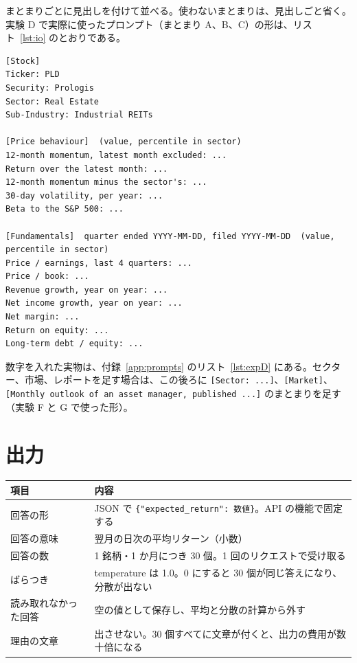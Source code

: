 \documentclass[xelatex,ja=standard,jafont=hiragino-pron,a4paper,10pt]{bxjsreport}
\newcommand{\code}[1]{\texttt{#1}}
\begin{document}
まとまりごとに見出しを付けて並べる。使わないまとまりは、見出しごと省く。実験 D で実際に使ったプロンプト（まとまり A、B、C）の形は、リスト~\ref{lst:io} のとおりである。

\begin{lstlisting}[caption={プロンプトの形（値は省略。かっこの中はセクターの中での百分位）},label={lst:io}]
[Stock]
Ticker: PLD
Security: Prologis
Sector: Real Estate
Sub-Industry: Industrial REITs

[Price behaviour]  (value, percentile in sector)
12-month momentum, latest month excluded: ...
Return over the latest month: ...
12-month momentum minus the sector's: ...
30-day volatility, per year: ...
Beta to the S&P 500: ...

[Fundamentals]  quarter ended YYYY-MM-DD, filed YYYY-MM-DD  (value, percentile in sector)
Price / earnings, last 4 quarters: ...
Price / book: ...
Revenue growth, year on year: ...
Net income growth, year on year: ...
Net margin: ...
Return on equity: ...
Long-term debt / equity: ...
\end{lstlisting}

数字を入れた実物は、付録~\ref{app:prompts} のリスト~\ref{lst:expD} にある。セクター、市場、レポートを足す場合は、この後ろに \code{[Sector: ...]}、\code{[Market]}、\code{[Monthly outlook of an asset manager, published ...]} のまとまりを足す（実験 F と G で使った形）。

\section{出力}

\begin{longtable}{p{3.60cm}p{10.80cm}}
\toprule
\textbf{項目} & \textbf{内容} \\
\midrule
\endfirsthead
\bottomrule
\endfoot
回答の形 & JSON で \code{\{"expected\_return": 数値\}}。API の機能で固定する \\
回答の意味 & 翌月の日次の平均リターン（小数） \\
回答の数 & 1 銘柄・1 か月につき 30 個。1 回のリクエストで受け取る \\
ばらつき & temperature は 1.0。0 にすると 30 個が同じ答えになり、分散が出ない \\
読み取れなかった回答 & 空の値として保存し、平均と分散の計算から外す \\
理由の文章 & 出させない。30 個すべてに文章が付くと、出力の費用が数十倍になる \\
\end{longtable}
\end{document}
